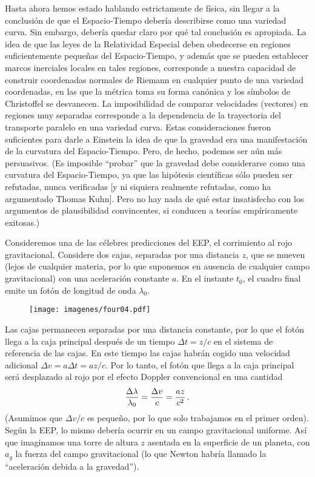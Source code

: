\documentclass[11pt,b5paper,openany,twoside]{book}
\begin{document}
Hasta ahora hemos estado hablando estrictamente de física, sin llegar a la conclusión de que el Espacio-Tiempo debería describirse como una variedad curva.
Sin embargo, debería quedar claro por qué tal conclusión es apropiada.
La idea de que las leyes de la Relatividad Especial deben obedecerse en regiones suficientemente pequeñas del Espacio-Tiempo, y además que se pueden establecer marcos inerciales locales en tales regiones, corresponde a nuestra capacidad de construir coordenadas normales de Riemann en cualquier punto de una variedad coordenadas, en las que la métrica toma su forma canónica y los símbolos de Christoffel se desvanecen.
La imposibilidad de comparar velocidades (vectores) en regiones muy separadas corresponde a la dependencia de la trayectoria del transporte paralelo en una variedad curva.
Estas consideraciones fueron suficientes para darle a Einstein la idea de que la gravedad era una manifestación de la curvatura del Espacio-Tiempo.
Pero, de hecho, podemos ser aún más persuasivos.
(Es imposible ``probar'' que la gravedad debe considerarse como una curvatura del Espacio-Tiempo, ya que las hipótesis científicas sólo pueden ser refutadas, nunca verificadas [y ni siquiera realmente refutadas, como ha argumentado Thomas Kuhn].
Pero no hay nada de qué estar insatisfecho con los argumentos de plausibilidad convincentes, si conducen a teorías empíricamente exitosas.)

Consideremos una de las célebres predicciones del EEP, el corrimiento al rojo gravitacional.
Considere dos cajas, separadas por una distancia $z$, que se mueven (lejos de cualquier materia, por lo que suponemos en ausencia de cualquier campo gravitacional) con una aceleración constante $a$.
En el instante $t_0$, el cuadro final emite un fotón de longitud de onda $\lambda_0$.

\begin{figure}[h]
\centering
\texttt{[image: imagenes/four04.pdf]}
\end{figure}

Las cajas permanecen separadas por una distancia constante, por lo que el fotón llega a la caja principal después de un tiempo $\Delta t = z/c$ en el sistema de referencia de las cajas.
En este tiempo las cajas habrán cogido una velocidad adicional $\Delta v = a\Delta t = az/c$.
Por lo tanto, el fotón que llega a la caja principal será desplazado al rojo por el efecto Doppler convencional en una cantidad
\begin{equation}
{{\Delta \lambda}\over {\lambda_0}}={{\Delta v}\over c} =
{{az}\over{c^2}}\,.\label{4.5}
\end{equation}
(Asumimos que $\Delta v/c$ es pequeño, por lo que solo trabajamos en el primer orden).
Según la EEP, lo mismo debería ocurrir en un campo gravitacional uniforme.
Así que imaginamos una torre de altura $z$ asentada en la superficie de un planeta, con $a_g$ la fuerza del campo gravitacional (lo que Newton habría llamado la ``aceleración debida a la gravedad'').
\end{document}
